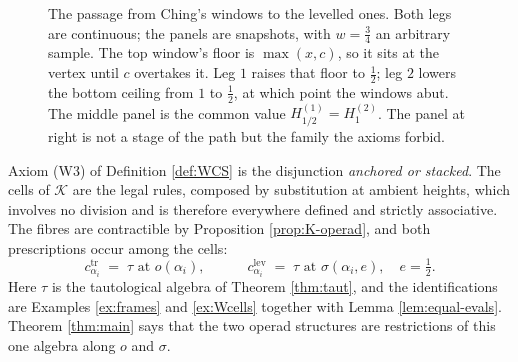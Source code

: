 \documentclass[12pt]{amsart}
\theoremstyle{definition}
\theoremstyle{remark}
\newcommand{\Kop}{\mathcal{K}}                   %
\begin{document}
\begin{figure}[htbp]
\caption{The passage from Ching's windows to the levelled ones. Both legs are continuous; the panels are snapshots, with $w=\tfrac34$ an arbitrary sample. The top window's floor is $\max(x,c)$, so it sits at the vertex until $c$ overtakes it. Leg $1$ raises that floor to $\tfrac12$; leg $2$ lowers the bottom ceiling from $1$ to $\tfrac12$, at which point the windows abut. The middle panel is the common value $H^{(1)}_{1/2} = H^{(2)}_{1}$. The panel at right is not a stage of the path but the family the axioms forbid.}
\label{fig:legs}
\end{figure}

Axiom (W3) of Definition \ref{def:WCS} is the disjunction \emph{anchored or stacked}. The cells of $\Kop$ are the legal rules, composed by substitution at ambient heights, which involves no division and is therefore everywhere defined and strictly associative. The fibres are contractible by Proposition \ref{prop:K-operad}, and both prescriptions occur among the cells:
\[ c^{\mathrm{tr}}_{\alpha_i} \;=\; \tau \text{ at } o(\alpha_i), \quad\quad\quad c^{\mathrm{lev}}_{\alpha_i} \;=\; \tau \text{ at } \sigma(\alpha_i, e), \quad e = \tfrac12.\]
Here $\tau$ is the tautological algebra of Theorem \ref{thm:taut}, and the identifications are Examples \ref{ex:frames} and \ref{ex:Wcells} together with Lemma \ref{lem:equal-evals}. Theorem \ref{thm:main} says that the two operad structures are restrictions of this one algebra along $o$ and $\sigma$.
\end{document}
